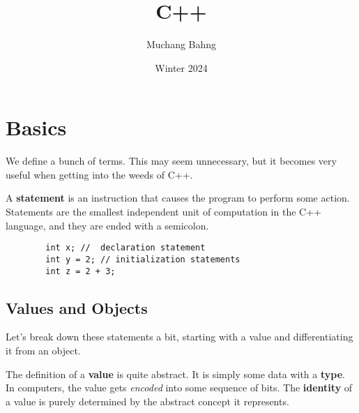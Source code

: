 \documentclass{article}
\begin{document}
\title{C++}
\author{Muchang Bahng}
\date{Winter 2024}

\maketitle
\tableofcontents
\pagebreak

\section{Basics} 

    We define a bunch of terms. This may seem unnecessary, but it becomes very useful when getting into the weeds of C++. 

    \begin{definition}[Statements]
      A \textbf{statement} is an instruction that causes the program to perform some action. Statements are the smallest independent unit of computation in the C++ language, and they are ended with a semicolon. 
      \begin{lstlisting}
        int x; //  declaration statement 
        int y = 2; // initialization statements  
        int z = 2 + 3;
      \end{lstlisting}
    \end{definition}

  \subsection{Values and Objects}

    Let's break down these statements a bit, starting with a value and differentiating it from an object.  

    \begin{definition}[Value]
      The definition of a \textbf{value} is quite abstract. It is simply some data with a \textbf{type}. In computers, the value gets \textit{encoded} into some sequence of bits. The \textbf{identity} of a value is purely determined by the abstract concept it represents. 
    \end{definition}
\end{document}
